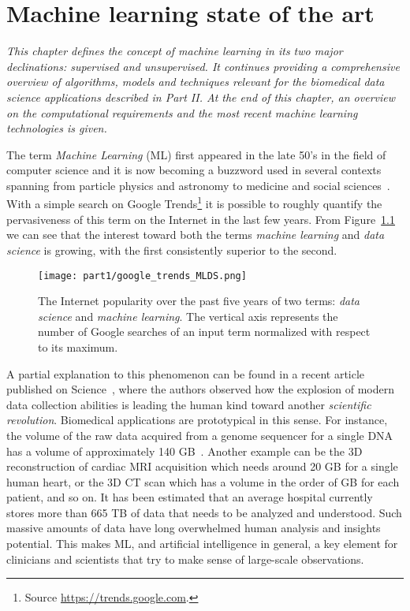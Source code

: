 
\chapter{Machine learning state of the art} \label{chap:state-of-the-art}

\begin{displayquote}
	\textit{This chapter defines the concept of machine learning in its two major declinations: supervised and unsupervised. It continues providing a comprehensive overview  of algorithms, models and techniques relevant for the biomedical data science applications described in Part II. At the end of this chapter, an overview on the computational requirements and the most recent machine learning technologies is given.}
\end{displayquote}

The term \textit{Machine Learning} (ML) first appeared in the late 50's in the field of computer science and it is now becoming a buzzword used in several contexts spanning from particle physics and astronomy to medicine and social sciences~\cite{service2017ai}.
With a simple search on Google Trends\footnote{Source \url{https://trends.google.com}.} it is possible to roughly quantify the pervasiveness of this term on the Internet in the last few years. From Figure~\ref{fig:google_trend_ML} we can see that the interest toward both the terms \textit{machine learning} and \textit{data science} is growing, with the first consistently superior to the second.

\begin{figure}[h!]
  \centering
    \texttt{[image: part1/google\_trends\_MLDS.png]}
  \caption{The Internet popularity over the past five years of two terms: \textit{data science} and \textit{machine learning}. The vertical axis represents the number of Google searches of an input term normalized with respect to its maximum.} \label{fig:google_trend_ML}
\end{figure}

A partial explanation to this phenomenon can be found in a recent article published on Science~\cite{appenzeller2017revolution}, where the authors observed how the explosion of modern data collection abilities is leading the human kind toward another \textit{scientific revolution}.
Biomedical applications are prototypical in this sense. For instance, the volume of the raw data acquired from a genome sequencer for a single \ac{DNA} has a volume of approximately 140 GB~\cite{marx2013biology}. Another example can be the 3D reconstruction of cardiac MRI acquisition which needs around 20 GB for a single human heart, or the 3D \ac{CT} scan which has a volume in the order of GB for each patient, and so on. It has been estimated that an average hospital currently stores more than 665 TB of data that needs to be analyzed and understood.
Such massive amounts of data have long overwhelmed human analysis and insights potential. This makes ML, and artificial intelligence in general, a key element for clinicians and scientists that try to make sense of large-scale observations.


